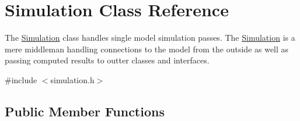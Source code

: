 \hypertarget{class_simulation}{}\section{Simulation Class Reference}
\label{class_simulation}


The \mbox{\hyperlink{class_simulation}{Simulation}} class handles single model simulation passes. The \mbox{\hyperlink{class_simulation}{Simulation}} is a mere middleman handling connections to the model from the outside as well as passing computed results to outter classes and interfaces.  




{\ttfamily \#include $<$simulation.\+h$>$}

\subsection*{Public Member Functions}
